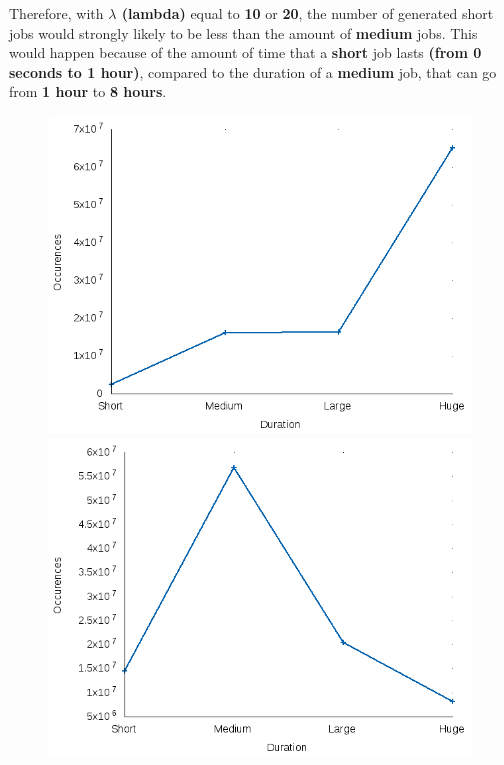 \documentclass{scrreprt}
\begin{document}
\begin{figure}[!htb]
\begin{minipage}{.33\textwidth}
\end{minipage}
\end{figure}

Therefore, with \textbf{$\lambda$ (lambda)} equal to \textbf{10} or \textbf{20}, the number of generated short jobs would strongly likely to be less than the amount of \textbf{medium} jobs. This would happen because of the amount of time that a \textbf{short} job lasts \textbf{(from 0 seconds to 1 hour)}, compared to the duration of a \textbf{medium} job, that can go from \textbf{1 hour} to \textbf{8 hours}. 


\begin{figure}[!htb]
\centering
\begin{minipage}{.33\textwidth}
  \centering
  \includegraphics[width=.9\linewidth]{typeslambda1.png}
\end{minipage}%
\begin{minipage}{.33\textwidth}
  \centering
  \includegraphics[width=.9\linewidth]{typeslambda10.png}

\end{minipage}
\end{figure}
\end{document}
